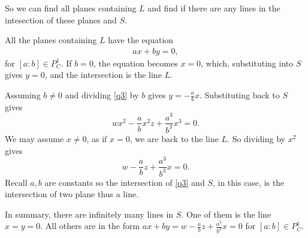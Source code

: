 \documentclass{article}
\theoremstyle{definition}
\theoremstyle{definition}
\theoremstyle{remark}
\begin{document}
So we can find all planes containing $L$ and find if there are any lines in the intesection of these planes and $S$.

All the planes containing $L$ have the equation 
\begin{align}\label{q3}
	ax + by = 0,
\end{align}
for $[a:b] \in P_C^1$.
If $b = 0$, the equation becomes $x = 0$, which, substituting into $S$ gives $y = 0$, and the intersection is the line $L$. 

Assuming $b \neq 0$ and dividing \eqref{q3} by $b$ gives $y = -\frac{a}{b} x$. 
Substituting back to $S$ gives 
$$
	w x^2  - \frac{a}{b} x^2z + \frac{a^3}{b^3} x^3 = 0.
$$
We may assume $x \neq 0$, as if $x = 0$, we are back to the line $L$.
So dividing by $x^2$ gives
$$
	w - \frac{a}{b} z + \frac{a^3}{b^3} x = 0.
$$
Recall $a,b$ are constants so the intersection of \eqref{q3} and $S$, in this case, is the intersection of two plane thus a line.

In summary, there are infinitely many lines in $S$.
One of them is the line $x = y = 0$. 
All others are in the form $ax + by = w - \frac{a}{b}z + \frac{a^3}{b^3} x = 0$ for $[a:b] \in P_C^1$.
\end{document}
